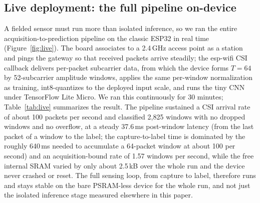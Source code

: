 \documentclass{ieeeaccess}
\begin{document}
\subsection{Live deployment: the full pipeline on-device}
\label{sec:results-live}
A fielded sensor must run more than isolated inference, so we ran the entire acquisition-to-prediction pipeline on the classic ESP32 in real time (Figure~\ref{fig:live}). The board associates to a 2.4\,GHz access point as a station and pings the gateway so that received packets arrive steadily; the esp-wifi CSI callback delivers per-packet subcarrier data, from which the device forms $T{=}64$ by 52-subcarrier amplitude windows, applies the same per-window normalization as training, int8-quantizes to the deployed input scale, and runs the tiny CNN under TensorFlow Lite Micro. We ran this continuously for 30 minutes; Table~\ref{tab:live} summarizes the result. The pipeline sustained a CSI arrival rate of about 100 packets per second and classified 2{,}825 windows with no dropped windows and no overflow, at a steady 37.6\,ms post-window latency (from the last packet of a window to the label; the capture-to-label time is dominated by the roughly 640\,ms needed to accumulate a 64-packet window at about 100 per second) and an acquisition-bound rate of 1.57 windows per second, while the free internal SRAM varied by only about 2.5\,kB over the whole run and the device never crashed or reset. The full sensing loop, from capture to label, therefore runs and stays stable on the bare PSRAM-less device for the whole run, and not just the isolated inference stage measured elsewhere in this paper.
\end{document}
